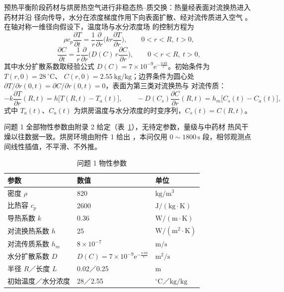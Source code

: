 预热平衡阶段药材与烘房热空气进行非稳态热--质交换：热量经表面对流换热进入药材并沿
径向传导，水分在浓度梯度作用下向表面扩散、经对流传质进入空气
\cite{yan2026heat,srikiatden2007moisture}。在轴对称一维径向假设下，温度场与水分浓度场
的控制方程为
\begin{equation}
  \rho c_p\frac{\partial T}{\partial t}
  =\frac{1}{r}\frac{\partial}{\partial r}\Big(k r\frac{\partial T}{\partial r}\Big),
  \qquad 0<r<R,\ t>0,
  \label{eq:heat}
\end{equation}
\begin{equation}
  \frac{\partial C}{\partial t}
  =\frac{1}{r}\frac{\partial}{\partial r}\Big(D(C)\,r\frac{\partial C}{\partial r}\Big),
  \qquad 0<r<R,\ t>0,
  \label{eq:moist}
\end{equation}
其中水分扩散系数取经验公式 $D(C)=7\times10^{-9}\mathrm{e}^{-\frac{0.89}{C}}$。初始条件为 $T(r,0)=28\,^{\circ}\mathrm{C}$、
$C(r,0)=2.55\ \mathrm{kg/kg}$；边界条件为圆心处
$\partial T/\partial r(0,t)=\partial C/\partial r(0,t)=0$，表面为第三类对流换热与
对流传质：
\begin{equation}
  -k\frac{\partial T}{\partial r}(R,t)=h\big[T(R,t)-T_a(t)\big],
  \qquad
  -D(C_s)\frac{\partial C}{\partial r}(R,t)=h_m\big[C_s(t)-C_a(t)\big],
  \label{eq:bcR}
\end{equation}
式中 $T_a(t)$、$C_a(t)$ 为烘房温度与水分浓度的时变序列，$C_s(t)=C(R,t)$。


问题 1 全部物性参数由附录 2 给定（表~\ref{tab:params}），无待定参数，量级与中药材
热风干燥以往数据一致\cite{wang2024drying}。烘房环境由附件 1 给出
，本问仅用
$0\sim1800\,\mathrm{s}$ 段，相邻观测点间线性插值，不平滑、不外推。

\begin{table}[htbp]
  \centering
  \caption{问题 1 物性参数}
  \label{tab:params}
  \begin{tabular}{lll}
    \hline
    参数 & 数值 & 单位 \\
    \hline
    密度 $\rho$ & 820 & $\mathrm{kg/m^3}$ \\
    比热容 $c_p$ & 2600 & $\mathrm{J/(kg\cdot K)}$ \\
    导热系数 $k$ & 0.36 & $\mathrm{W/(m\cdot K)}$ \\
    对流换热系数 $h$ & 25 & $\mathrm{W/(m^2\cdot K)}$ \\
    对流传质系数 $h_m$ & $8\times10^{-7}$ & $\mathrm{m/s}$ \\
    水分扩散系数 $D$ & $D(C)=7\times10^{-9}\mathrm{e}^{-\frac{0.89}{C}}$ & $\mathrm{m^2/s}$ \\
    半径 $R$／长度 $L$ & 0.02／0.25 & $\mathrm{m}$ \\
    初始温度／水分浓度 & 28／2.55 & $^{\circ}\mathrm{C}$／$\mathrm{kg/kg}$ \\
    \hline
  \end{tabular}
\end{table}

